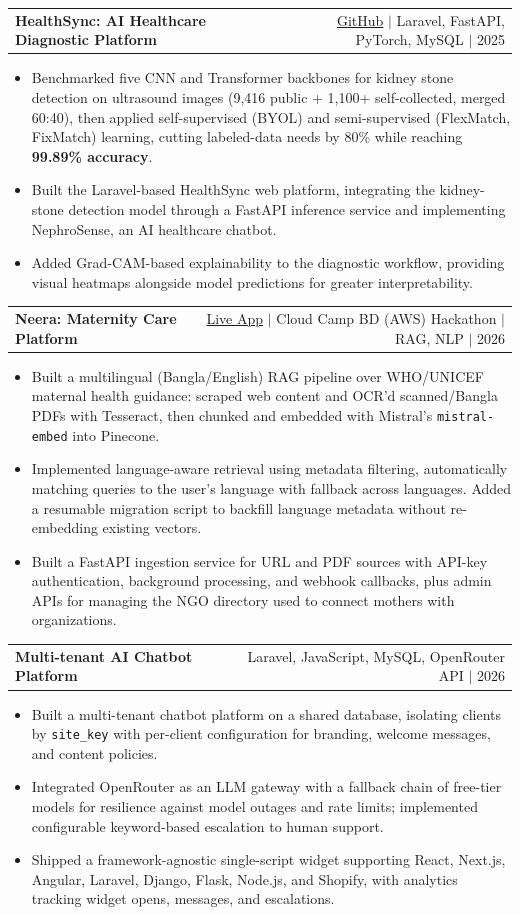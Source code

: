 \documentclass[letterpaper,10pt]{article}
\makeatletter
\newcommand{\tworow}[2]{%
  \begin{tabular*}{\textwidth}{@{}l@{\extracolsep{\fill}}r@{}}#1 & #2\end{tabular*}\par}
\newcommand{\project}[4]{%
  \needspace{4\baselineskip}%
  \tworow{\textbf{#1}}{\footnotesize\href{#3}{#2} {\color{midgray}$|$ #4}}\vspace{1pt}}
\newcommand{\projectnolink}[2]{%
  \needspace{4\baselineskip}%
  \tworow{\textbf{#1}}{\footnotesize\color{midgray}#2}\vspace{1pt}}
\makeatother
\begin{document}
\project{HealthSync: AI Healthcare Diagnostic Platform}{GitHub}{https://github.com/RahMaisha/Health-Sync-Capstone}{Laravel, FastAPI, PyTorch, MySQL $|$ 2025}
\begin{itemize}
  \item Benchmarked five CNN and Transformer backbones for kidney stone detection on ultrasound images (9,416 public + 1,100+ self-collected, merged 60:40), then applied self-supervised (BYOL) and semi-supervised (FlexMatch, FixMatch) learning, cutting labeled-data needs by 80\% while reaching \textbf{99.89\% accuracy}.
  \item Built the Laravel-based HealthSync web platform, integrating the kidney-stone detection model through a FastAPI inference service and implementing NephroSense, an AI healthcare chatbot.
  \item Added Grad-CAM-based explainability to the diagnostic workflow, providing visual heatmaps alongside model predictions for greater interpretability.
\end{itemize}

\vspace{3pt}
\project{Neera: Maternity Care Platform}{Live App}{https://neera-maternal-care-assistant.vercel.app/}{Cloud Camp BD (AWS) Hackathon $|$ RAG, NLP $|$ 2026}
\begin{itemize}
  \item Built a multilingual (Bangla/English) RAG pipeline over WHO/UNICEF maternal health guidance: scraped web content and OCR'd scanned/Bangla PDFs with Tesseract, then chunked and embedded with Mistral's \texttt{mistral-embed} into Pinecone.
  \item Implemented language-aware retrieval using metadata filtering, automatically matching queries to the user's language with fallback across languages. Added a resumable migration script to backfill language metadata without re-embedding existing vectors.
  \item Built a FastAPI ingestion service for URL and PDF sources with API-key authentication, background processing, and webhook callbacks, plus admin APIs for managing the NGO directory used to connect mothers with organizations.
\end{itemize}

\vspace{3pt}
\projectnolink{Multi-tenant AI Chatbot Platform}{Laravel, JavaScript, MySQL, OpenRouter API $|$ 2026}
\begin{itemize}
  \item Built a multi-tenant chatbot platform on a shared database, isolating clients by \texttt{site\_key} with per-client configuration for branding, welcome messages, and content policies.
  \item Integrated OpenRouter as an LLM gateway with a fallback chain of free-tier models for resilience against model outages and rate limits; implemented configurable keyword-based escalation to human support.
  \item Shipped a framework-agnostic single-script widget supporting React, Next.js, Angular, Laravel, Django, Flask, Node.js, and Shopify, with analytics tracking widget opens, messages, and escalations.
\end{itemize}
\end{document}
